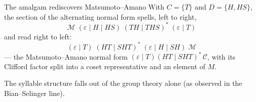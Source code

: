 \begin{frame}{The amalgam rediscovers Matsumoto--Amano \InPaper}
With $C=\{T\}$ and $D=\{H, HS\}$, the section of the alternating normal form spells, left to right,
\[
  \mathcal{M}\;(\varepsilon \mid H \mid HS)\;(TH \mid THS)^{*}\;(\varepsilon \mid T)
\]
and read right to left:
\[
  (\varepsilon \mid T)\;(HT \mid SHT)^{*}\;(\varepsilon \mid H \mid SH)\;\mathcal{M}
\]
--- the \alert{Matsumoto--Amano normal form}
$(\varepsilon\mid T)(HT\mid SHT)^*\,\mathcal{C}$, with its Clifford factor split
into a coset representative and an element of $M$.
\vspace{6pt}

\centering
{}

\vspace{4pt}
{\small The syllable structure falls out of the group theory alone (as observed in the
Bian--Selinger line).}
\end{frame}

